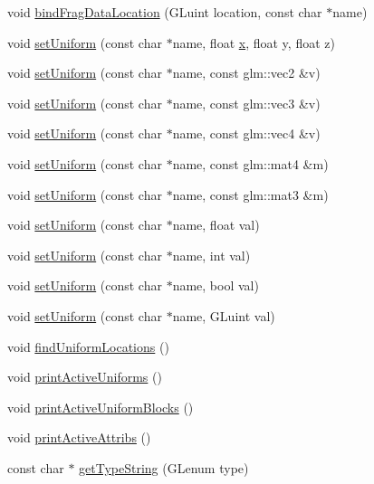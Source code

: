 \begin{DoxyCompactItemize}
\item 
void \mbox{\hyperlink{class_g_l_s_l_program_a44270f942de121ef2493e26f1226a902}{bind\+Frag\+Data\+Location}} (G\+Luint location, const char $\ast$name)
\item 
void \mbox{\hyperlink{class_g_l_s_l_program_a85e4c896c2a8524cb4574a064a2dfb0c}{set\+Uniform}} (const char $\ast$name, float \mbox{\hyperlink{scenetexture_8cpp_ad0da36b2558901e21e7a30f6c227a45e}{x}}, float y, float z)
\item 
void \mbox{\hyperlink{class_g_l_s_l_program_af22f53e794e4ce01b8fb8a754ccc9594}{set\+Uniform}} (const char $\ast$name, const glm\+::vec2 \&v)
\item 
void \mbox{\hyperlink{class_g_l_s_l_program_a194871e083c912c8606310829d29ca0b}{set\+Uniform}} (const char $\ast$name, const glm\+::vec3 \&v)
\item 
void \mbox{\hyperlink{class_g_l_s_l_program_a9940fb2fedc6a3a3bf3719fdb544129f}{set\+Uniform}} (const char $\ast$name, const glm\+::vec4 \&v)
\item 
void \mbox{\hyperlink{class_g_l_s_l_program_a83bee010f567acc80b40ecd474ed4fe7}{set\+Uniform}} (const char $\ast$name, const glm\+::mat4 \&m)
\item 
void \mbox{\hyperlink{class_g_l_s_l_program_a39921eec3ba44044f1bc15d7102bba20}{set\+Uniform}} (const char $\ast$name, const glm\+::mat3 \&m)
\item 
void \mbox{\hyperlink{class_g_l_s_l_program_aae087de52f91a47ac23c9f6ebf369bc3}{set\+Uniform}} (const char $\ast$name, float val)
\item 
void \mbox{\hyperlink{class_g_l_s_l_program_a437782e359f10918044f1bbad0a98148}{set\+Uniform}} (const char $\ast$name, int val)
\item 
void \mbox{\hyperlink{class_g_l_s_l_program_acfab16fafb4617f0625f170b39716eb8}{set\+Uniform}} (const char $\ast$name, bool val)
\item 
void \mbox{\hyperlink{class_g_l_s_l_program_a759987af814d389c9081874ac788717f}{set\+Uniform}} (const char $\ast$name, G\+Luint val)
\item 
void \mbox{\hyperlink{class_g_l_s_l_program_a681b58ec2659b54468d3f32bfd11803d}{find\+Uniform\+Locations}} ()
\item 
void \mbox{\hyperlink{class_g_l_s_l_program_a75e11d36a5b634c58a84caa96c9c38e4}{print\+Active\+Uniforms}} ()
\item 
void \mbox{\hyperlink{class_g_l_s_l_program_ae0beab0aabdbef57e69ddbc724a8d1f9}{print\+Active\+Uniform\+Blocks}} ()
\item 
void \mbox{\hyperlink{class_g_l_s_l_program_aab7c8bc0e5d0b75a9eb0c60de3cda5b5}{print\+Active\+Attribs}} ()
\item 
const char $\ast$ \mbox{\hyperlink{class_g_l_s_l_program_a3cd8daf0887279e88164c6e60a759d67}{get\+Type\+String}} (G\+Lenum type)
\end{DoxyCompactItemize}
